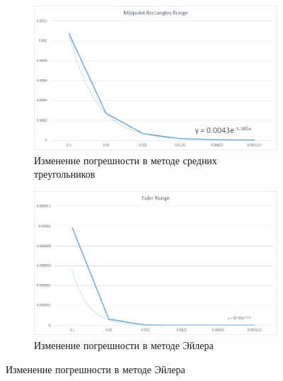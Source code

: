 \documentclass[11pt,a4paper,oneside]{article}
\begin{document}
\begin{figure}[h]
	\begin{subfigure}{\textwidth}
		\centering
		\includegraphics[width=0.8\linewidth]{pics/midpoint_errors.png}
		\caption{Изменение погрешности в методе средних треугольников}
	\end{subfigure}
	\begin{subfigure}{\textwidth}
		\centering
		\includegraphics[width=0.8\linewidth]{pics/euler_errors.png}
		\caption{Изменение погрешности в методе Эйлера}
	\end{subfigure}
\end{figure}
\end{document}
